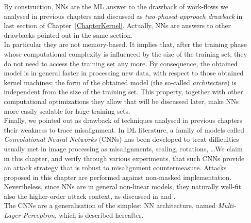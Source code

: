 By construction, NNs are the ML answer to the drawback of work-flows we analysed in previous chapters and discussed as \emph{two-phased approach drawback} in last section of Chapter~\ref{ChapterKernel}. Actually, NNs are answers to other drawbacks pointed out in the same section. \\
In particular they are not memory-based. It implies that, after the training phase whose computational complexity is influenced by the size of the training set, they do not need to access the training set any more. By consequence, the obtained model is in general faster in processing new data, with respect to those obtained \via kernel machines: the form of the obtained model (\ie the so-called \emph{architecture}) is independent from the size of the training set. This property, together with other computational optimizations they allow that will be discussed later, make NNs more easily scalable for huge training sets.\\
Finally, we pointed out as drawback of techniques analysed in previous chapters their weakness to trace misalignment. In DL literature, a family of models called \emph{Convolutional Neural Networks} (CNNs) has been developed to treat difficulties usually met in image processing as misalignments, scaling, rotations, \dots We claim in this chapter, and verify through various experiments, that such CNNs provide an attack strategy that is robust to misalignment countermeasure. Attacks proposed in this chapter are performed against non-masked implementation. Nevertheless, since NNs are in general non-linear models, they naturally well-fit also the higher-order attack context, as discussed in \cite{maghrebi2016breaking} and \cite{DLwhitepaper}.\\
The CNNs are a generalisation of the simplest NN architecture, named \emph{Multi-Layer Perceptron}, which is described hereafter. 




